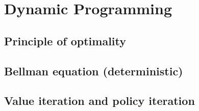
\section{Dynamic Programming}

\subsection{Principle of optimality}


\subsection{Bellman equation (deterministic)}


\subsection{Value iteration and policy iteration}

